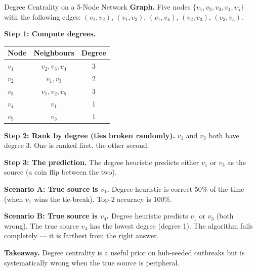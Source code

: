 \begin{examplebox}{Degree Centrality on a 5-Node Network}
\textbf{Graph.} Five nodes $\{v_1, v_2, v_3, v_4, v_5\}$ with the following edges:
$(v_1, v_2)$, $(v_1, v_3)$, $(v_1, v_4)$, $(v_2, v_3)$, $(v_3, v_5)$.

\begin{center}
\end{center}

\textbf{Step 1: Compute degrees.}
\begin{center}
\small
\begin{tabular}{lcc}
\toprule
Node & Neighbours & Degree \\
\midrule
$v_1$ & $v_2, v_3, v_4$ & 3 \\
$v_2$ & $v_1, v_3$       & 2 \\
$v_3$ & $v_1, v_2, v_5$  & 3 \\
$v_4$ & $v_1$            & 1 \\
$v_5$ & $v_3$            & 1 \\
\bottomrule
\end{tabular}
\end{center}

\textbf{Step 2: Rank by degree (ties broken randomly).}
$v_1$ and $v_3$ both have degree 3. One is ranked first, the other second.

\textbf{Step 3: The prediction.} The degree heuristic predicts either $v_1$ or $v_3$
as the source (a coin flip between the two).

\textbf{Scenario A: True source is $v_1$.} Degree heuristic is correct 50\% of the
time (when $v_1$ wins the tie-break). Top-2 accuracy is 100\%.

\textbf{Scenario B: True source is $v_4$.} Degree heuristic predicts $v_1$ or $v_3$
(both wrong). The true source $v_4$ has the lowest degree (degree 1). The algorithm
fails completely --- it is farthest from the right answer.

\textbf{Takeaway.} Degree centrality is a useful prior on hub-seeded outbreaks but is
systematically wrong when the true source is peripheral.
\end{examplebox}

